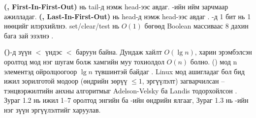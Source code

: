 \textbf{ (, First-In-First-Out)} нь tail-д нэмж head-ээс авдаг. -ийн  ийм зарчмаар ажилладаг. \textbf{ (, Last-In-First-Out)} нь head-д нэмж head-ээс авдаг . \textbf{}-д 1 бит нь 1 нөөцийг илэрхийлнэ. set/clear/test нь $O(1)$ бөгөөд Boolean массиваас 8 дахин бага зай эзэлнэ .

\textbf{ ()}-д зүүн $<$ үндэс $<$ баруун байна. Дундаж хайлт $O(\lg n)$, харин эрэмбэлсэн оролтод мод нэг шугам болж хамгийн муу тохиолдол $O(n)$ болно.  () мод n элементэд ойролцоогоор $\lg n$ түвшинтэй байдаг . Linux  мод ашигладаг бол бид ижил зорилготой  модоор (өндрийн зөрүү $\le 1$, эргүүлэлт) загварчилсан --  тэнцвэржилтийн анхны алгоритмыг Adelson-Velsky ба Landis тодорхойлсон . Зураг 1.2 нь ижил 1--7 оролтод энгийн  ба -ийн өндрийн ялгааг, Зураг 1.3 нь -ийн нэг зүүн эргүүлэлтийг харуулав.

